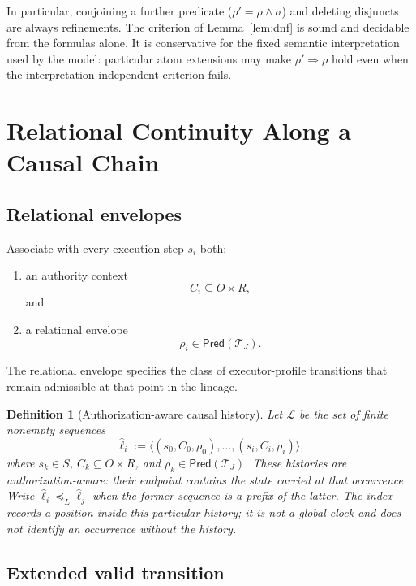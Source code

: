 \documentclass[10pt,twocolumn]{article}
\newcommand{\Transitions}{\mathcal{T}}
\newcommand{\Lineages}{\mathcal{L}}
\newcommand{\Pred}{\mathsf{Pred}}
\newtheorem{definition}{Definition}
\begin{document}
In particular, conjoining a further predicate
(\(\rho'=\rho\land\sigma\)) and deleting disjuncts are always refinements. The
criterion of Lemma~\ref{lem:dnf} is sound and decidable from the formulas alone.
It is conservative for the fixed semantic interpretation used by the model:
particular atom extensions may make \(\rho'\Rightarrow\rho\) hold even when the
interpretation-independent criterion fails.

\section{Relational Continuity Along a Causal Chain}

\subsection{Relational envelopes}

Associate with every execution step \(s_i\) both:

\begin{enumerate}
    \item an authority context
    \[
    C_i\subseteq O\times R,
    \]
    and
    \item a relational envelope
    \[
    \rho_i\in\Pred(\Transitions_J).
    \]
\end{enumerate}

The relational envelope specifies the class of executor-profile transitions
that remain admissible at that point in the lineage.

\begin{definition}[Authorization-aware causal history]\label{def:lineage}
Let \(\Lineages\) be the set of finite nonempty sequences
\[
\widehat{\ell}_i
:=
\langle
(s_0,C_0,\rho_0),\ldots,(s_i,C_i,\rho_i)
\rangle,
\]
where \(s_k\in S\), \(C_k\subseteq O\times R\), and
\(\rho_k\in\Pred(\Transitions_J)\). These histories are
\emph{authorization-aware}: their endpoint contains the state carried at that
occurrence. Write
\(\widehat{\ell}_i\preceq_L\widehat{\ell}_j\) when the former sequence is a
prefix of the latter. The index records a position inside this particular
history; it is not a global clock and does not identify an occurrence without
the history.
\end{definition}

\subsection{Extended valid transition}
\end{document}
